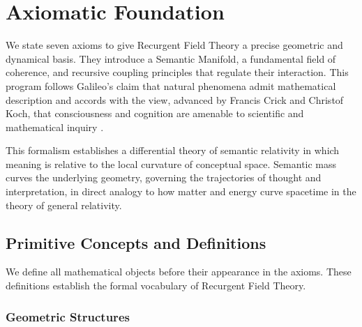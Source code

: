 \chapter{Axiomatic Foundation}
\label{1:axiomatic_foundation}


We state seven axioms to give Recurgent Field Theory a precise geometric and dynamical basis. They introduce a Semantic Manifold, a fundamental field of coherence, and recursive coupling principles that regulate their interaction. This program follows Galileo's claim that natural phenomena admit mathematical description \autocite{Galilei1623} and accords with the view, advanced by Francis Crick and Christof Koch, that consciousness and cognition are amenable to scientific and mathematical inquiry \autocite{Crick1990, KochConsciousness2019}.

This formalism establishes a differential theory of semantic relativity in which meaning is relative to the local curvature of conceptual space. Semantic mass curves the underlying geometry, governing the trajectories of thought and interpretation, in direct analogy to how matter and energy curve spacetime in the theory of general relativity.


\section{Primitive Concepts and Definitions}
\label{1.1:primitive_concepts_and_definitions}

We define all mathematical objects before their appearance in the axioms. These definitions establish the formal vocabulary of Recurgent Field Theory.


\subsection{Geometric Structures}
\label{1.1.1:geometric_structures}

